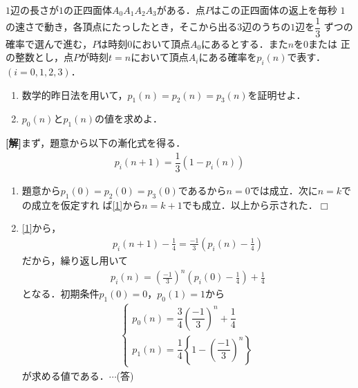 \documentclass[a4j]{jarticle}
\begin{document}

     \begin{oframed}
     $1$辺の長さが$1$の正四面体$A_0A_1A_2A_3$がある．点$P$はこの正四面体の返上を毎秒
     $1$の速さで動き，各頂点にたっしたとき，そこから出る$3$辺のうちの$1$辺を$\dfrac{1}{3}$
     ずつの確率で選んで進む，$P$は時刻$0$において頂点$A_0$にあるとする．また$n$を$0$または
     正の整数とし，点$P$が時刻$t=n$において頂点$A_i$にある確率を$p_i(n)$で表す．$(i=0,1,2,3)$．
          \begin{enumerate}[(1)]
          \item 数学的昨日法を用いて，$p_1(n)=p_2(n)=p_3(n)$を証明せよ．
          \item $p_0(n)$と$p_1(n)$の値を求めよ．
          \end{enumerate}
     \end{oframed}

\setlength{\columnseprule}{0.4pt}
\begin{multicols}{2}
{\bf[解]}まず，題意から以下の漸化式を得る．
     \begin{align}
          p_i(n+1)=\dfrac{1}{3}(1-p_i(n)) \label{1}
     \end{align}
     \begin{enumerate}[(1)]
     \item 題意から$p_1(0)=p_2(0)=p_3(0)$であるから$n=0$では成立．次に$n=k$での成立を仮定すれ
     ば\eqref{1}から$n=k+1$でも成立．以上から示された．$\Box$
     \item \eqref{1}から，
          \begin{align*}
          p_i(n+1)-\frac{1}{4}=\frac{-1}{3}\left(p_i(n)-\frac{1}{4}\right)
          \end{align*}
     だから，繰り返し用いて
          \begin{align*}
          p_i(n)=\left(\frac{-1}{3}\right)^n\left(p_i(0)-\frac{1}{4}\right)+\frac{1}{4}
          \end{align*}
     となる．初期条件$p_1(0)=0$，$p_0(1)=1$から
          \begin{align*}
          \left\{
               \begin{array}{l}
               p_0(n)=\dfrac{3}{4}\left(\dfrac{-1}{3}\right)^n+\dfrac{1}{4} \\
               p_1(n)=\dfrac{1}{4}\left\{1-\left(\dfrac{-1}{3}\right)^n\right\}
               \end{array}
          \right.
          \end{align*}
     が求める値である．$\cdots$(答)
     \end{enumerate}   
\newpage
\end{multicols}
\end{document}
